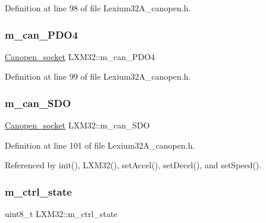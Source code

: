 Definition at line 98 of file Lexium32\+A\+\_\+canopen.\+h.

\mbox{\label{class_l_x_m32_a856973a186284f33da9be2a4a585305c}} 
\subsubsection{\texorpdfstring{m\+\_\+can\+\_\+\+P\+D\+O4}{m\_can\_PDO4}}
{\footnotesize\ttfamily \hyperlink{class_canopen__socket}{Canopen\+\_\+socket} L\+X\+M32\+::m\+\_\+can\+\_\+\+P\+D\+O4\hspace{0.3cm}{\ttfamily [private]}}



Definition at line 99 of file Lexium32\+A\+\_\+canopen.\+h.

\mbox{\label{class_l_x_m32_a7861b906134f87686198df5ae72edc68}} 
\subsubsection{\texorpdfstring{m\+\_\+can\+\_\+\+S\+DO}{m\_can\_SDO}}
{\footnotesize\ttfamily \hyperlink{class_canopen__socket}{Canopen\+\_\+socket} L\+X\+M32\+::m\+\_\+can\+\_\+\+S\+DO\hspace{0.3cm}{\ttfamily [private]}}



Definition at line 101 of file Lexium32\+A\+\_\+canopen.\+h.



Referenced by init(), L\+X\+M32(), set\+Accel(), set\+Decel(), and set\+Speed().

\mbox{\label{class_l_x_m32_a7f84595b6e2160211690301486cacde6}} 
\subsubsection{\texorpdfstring{m\+\_\+ctrl\+\_\+state}{m\_ctrl\_state}}
{\footnotesize\ttfamily uint8\+\_\+t L\+X\+M32\+::m\+\_\+ctrl\+\_\+state\hspace{0.3cm}{\ttfamily [private]}}



